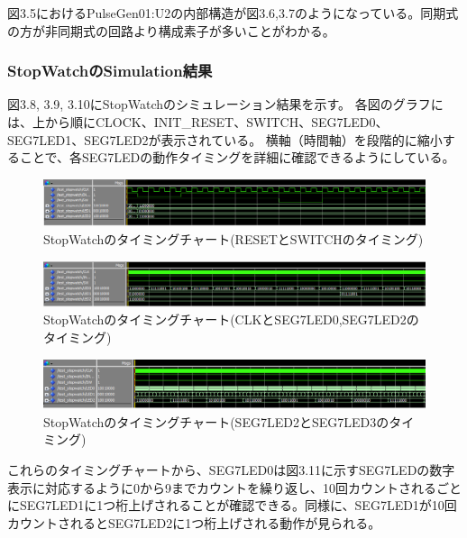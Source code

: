 \documentclass{jlreq}
\numberwithin{equation}{section}
\begin{document}
図3.5におけるPulseGen01:U2の内部構造が図3.6,3.7のようになっている。同期式の方が非同期式の回路より構成素子が多いことがわかる。

\subsubsection{StopWatchのSimulation結果}
図3.8, 3.9, 3.10にStopWatchのシミュレーション結果を示す。
各図のグラフには、上から順にCLOCK、INIT\_RESET、SWITCH、SEG7LED0、SEG7LED1、SEG7LED2が表示されている。
横軸（時間軸）を段階的に縮小することで、各SEG7LEDの動作タイミングを詳細に確認できるようにしている。

\begin{figure}[H]
  \centering
  \includegraphics[width=\textwidth]{assets/simulation01.png}
  \caption{StopWatchのタイミングチャート(RESETとSWITCHのタイミング)}
\end{figure}

\begin{figure}[H]
  \centering
  \includegraphics[width=\textwidth]{assets/simulation02.png}
  \caption{StopWatchのタイミングチャート(CLKとSEG7LED0,SEG7LED2のタイミング)}
\end{figure}

\begin{figure}[H]
  \centering
  \includegraphics[width=\textwidth]{assets/simulation03.png}
  \caption{StopWatchのタイミングチャート(SEG7LED2とSEG7LED3のタイミング)}
\end{figure}

これらのタイミングチャートから、SEG7LED0は図3.11に示すSEG7LEDの数字表示に対応するように0から9までカウントを繰り返し、10回カウントされるごとにSEG7LED1に1つ桁上げされることが確認できる。同様に、SEG7LED1が10回カウントされるとSEG7LED2に1つ桁上げされる動作が見られる。
\end{document}

